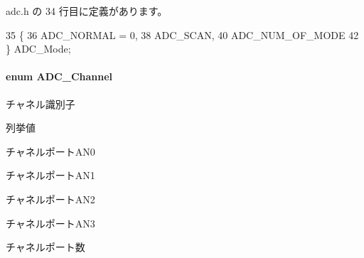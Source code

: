  adc.\+h の 34 行目に定義があります。


\begin{DoxyCode}
35 \{
36     ADC_NORMAL = 0,
38     ADC_SCAN,
40     ADC_NUM_OF_MODE
42 \} ADC_Mode;
\end{DoxyCode}
\paragraph[{A\+D\+C\+\_\+\+Channel}]{\setlength{\rightskip}{0pt plus 5cm}enum {\bf A\+D\+C\+\_\+\+Channel}}\label{adc_8h_ad7b9fa1ae8a65e534cce7d26fa0984f6_ad7b9fa1ae8a65e534cce7d26fa0984f6}


チャネル識別子 

\begin{Desc}
\item[列挙値]\par
\begin{description}
\item[{\em 
A\+D\+C\+\_\+\+A\+N0\label{adc_8h_ad7b9fa1ae8a65e534cce7d26fa0984f6_ad7b9fa1ae8a65e534cce7d26fa0984f6a2b312b52fe5d414d9bd2cba051dcd72a}
}]チャネルポート\+A\+N0 \item[{\em 
A\+D\+C\+\_\+\+A\+N1\label{adc_8h_ad7b9fa1ae8a65e534cce7d26fa0984f6_ad7b9fa1ae8a65e534cce7d26fa0984f6a1c51560713abb867567f99d4c78763bd}
}]チャネルポート\+A\+N1 \item[{\em 
A\+D\+C\+\_\+\+A\+N2\label{adc_8h_ad7b9fa1ae8a65e534cce7d26fa0984f6_ad7b9fa1ae8a65e534cce7d26fa0984f6acfaa570d9fd2190be56d1fc8cb23ef32}
}]チャネルポート\+A\+N2 \item[{\em 
A\+D\+C\+\_\+\+A\+N3\label{adc_8h_ad7b9fa1ae8a65e534cce7d26fa0984f6_ad7b9fa1ae8a65e534cce7d26fa0984f6adf2a7a958cab5ddfa2a8cde10bc6ab93}
}]チャネルポート\+A\+N3 \item[{\em 
A\+D\+C\+\_\+\+N\+U\+M\+\_\+\+O\+F\+\_\+\+C\+H\+A\+N\+N\+E\+L\label{adc_8h_ad7b9fa1ae8a65e534cce7d26fa0984f6_ad7b9fa1ae8a65e534cce7d26fa0984f6a3d2f32aec0a1ff17b92c055b8b05f9c6}
}]チャネルポート数 \end{description}
\end{Desc}


